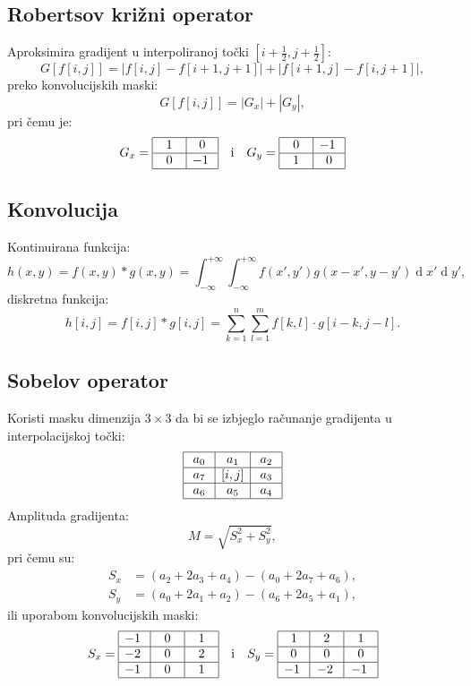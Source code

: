 \documentclass[11pt,english]{article}
\begin{document}
\subsection{Robertsov križni operator}
Aproksimira gradijent u interpoliranoj točki $\left [i+\frac{1}{2},j+\frac{1}{2}\right ]$:
$$G\left [f[i,j]\right ] = \left \vert f[i,j] - f[i+1,j+1]\right \vert + \left \vert f[i+1,j] - f[i,j+1] \right \vert,$$
preko konvolucijskih maski:
$$G\left [f[i,j]\right ] = \left \vert G_x \right \vert + \left \vert G_y \right \vert,$$
pri čemu je:
$$G_x =
\begin{array}{|c|c|}
\hline
\;~1~\; & \;0\;\\ \hline
\;~0~\; & -1\;\\ \hline
\end{array}
\quad \text{i} \quad
G_y =
\begin{array}{|c|c|}
\hline
\;~0~\; & -1\;\\ \hline
\;~1~\; & \;0\;\\ \hline
\end{array}$$

\subsection{Konvolucija}
Kontinuirana funkcija:
$$h(x,y) = f(x,y) \ast g(x,y) =  \int_{-\infty}^{+\infty}\int_{-\infty}^{+\infty} f(x', y')g(x-x', y-y')\operatorname{d}x'\operatorname dy',$$
diskretna funkcija:
$$h[i,j] = f[i,j] \ast g[i,j] = \sum_{k=1}^{n}\sum_{l=1}^m f[k,l]\cdot g[i-k,j-l].$$

\subsection{Sobelov operator}
Koristi masku dimenzija $3 \times 3$ da bi se izbjeglo računanje gradijenta u interpolacijskoj točki:
$$\begin{array}{|c|c|c|}
\hline
\;a_0\; & a_1 & \;a_2\;\\ \hline
a_7 &[i,j]& a_3\\ \hline
a_6 & a_5 & a_4\\ \hline
\end{array}$$
Amplituda gradijenta:
$$M = \sqrt{S_x^2 + S_y^2},$$
pri čemu su:
\begin{align*}
S_x &= (a_2+2a_3+a_4)-(a_0+2a_7+a_6),\\
S_y &= (a_0+2a_1+a_2)-(a_6+2a_5+a_1),
\end{align*}
ili uporabom konvolucijskih maski:
$$S_x =
\begin{array}{|c|c|c|}
\hline
-1\; & \;~0~\; & \;~1~\;\\ \hline
-2\; & \;0\; & \;2\;\\ \hline
-1\; & \;0\; & \;1\;\\ \hline
\end{array}
\quad \text{i} \quad
S_y =
\begin{array}{|c|c|c|}
\hline
~1\; & \;~2~\; & \;~1~\;\\ \hline
0 & 0 & 0\\ \hline
-1\; & -2\; & -1\;\\ \hline
\end{array}$$
\end{document}
